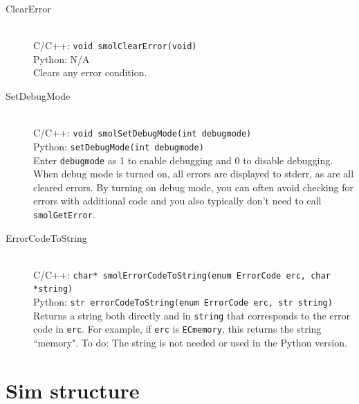\documentclass {book}
\newcommand {\ttt} {\texttt}
\begin{document}
\begin{description}
\item[ClearError]
\hfill \\
C/C++: \ttt{void smolClearError(void)}\\
Python: N/A\\
Clears any error condition.

\item[SetDebugMode]
\hfill \\
C/C++: \ttt{void smolSetDebugMode(int debugmode)}\\
Python: \ttt{setDebugMode(int debugmode)}\\
Enter \ttt{debugmode} as 1 to enable debugging and 0 to disable debugging. When debug mode is turned on, all errors are displayed to stderr, as are all cleared errors. By turning on debug mode, you can often avoid checking for errors with additional code and you also typically don't need to call \ttt{smolGetError}.

\item[ErrorCodeToString]
\hfill \\
C/C++: \ttt{char* smolErrorCodeToString(enum ErrorCode erc, char *string)}\\
Python: \ttt{str errorCodeToString(enum ErrorCode erc, str string)}\\
Returns a string both directly and in \ttt{string} that corresponds to the error code in \ttt{erc}. For example, if \ttt{erc} is \ttt{ECmemory}, this returns the string ``memory". To do: The string is not needed or used in the Python version.

\end{description}

\section{Sim structure}
\end{document}

